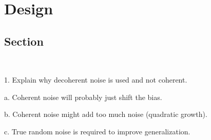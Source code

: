 \chapter{Design}\label{chapter:design}

\section{Section} \

1.	Explain why decoherent noise is used and not coherent. \

  a. Coherent noise will probably just shift the bias. \

  b. Coherent noise might add too much noise (quadratic growth). \

  c. True random noise is required to improve generalization. \

